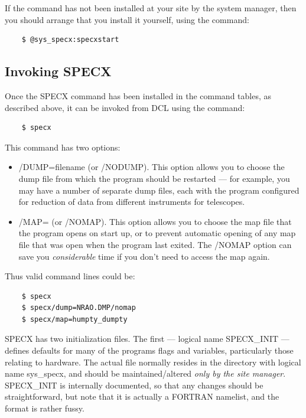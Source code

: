 \documentclass[11pt,twoside]{report}
\begin{document}
If the command has not been installed at your site by the system manager,
then you should arrange that you install it yourself, using the command:
\begin{verbatim}
    $ @sys_specx:specxstart
\end{verbatim}

\subsection{Invoking SPECX}

Once the SPECX command has been installed in the command tables, as described
above, it can be invoked from DCL using the command: 
\begin{verbatim}
    $ specx
\end{verbatim}
This command has two options:
\begin{itemize}
\item /DUMP=filename (or /NODUMP). This option
  allows you to choose the dump file from which the program should be restarted
  --- for example, you may have a number of separate dump files, each with the
  program configured for reduction of data from different instruments for
  telescopes. \item /MAP= (or /NOMAP). This option
  allows you to choose the map file that the program opens on start up, or to
  prevent automatic opening of any map file that was open when the program last
  exited. The /NOMAP option can save you {\em considerable} time if you don't
  need to access the map again. 
\end{itemize}

Thus valid command lines could be:
\begin{verbatim}
    $ specx
    $ specx/dump=NRAO.DMP/nomap
    $ specx/map=humpty_dumpty
\end{verbatim}
\etc

SPECX has two initialization files. The first ---
logical name SPECX\_INIT 
--- defines defaults for many of the
programs flags and variables, particularly those relating to hardware. The
actual file normally resides in the directory with logical name sys\_specx, and
should be maintained/altered {\em only by the site manager}. SPECX\_INIT is
internally documented, so that any changes should be straightforward, but note
that it is actually a FORTRAN namelist, and the format is rather fussy. 
\end{document}
